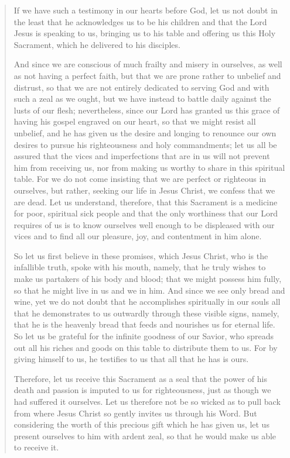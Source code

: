 \documentclass[
]{book}
\begin{document}
\begin{quote}
If we have such a testimony in our hearts before God, let us not doubt in the least that he acknowledges us to be his children and that the Lord Jesus is speaking to us, bringing us to his table and offering us this Holy Sacrament, which he delivered to his disciples.

And since we are conscious of much frailty and misery in ourselves, as well as not having a perfect faith, but that we are prone rather to unbelief and distrust, so that we are not entirely dedicated to serving God and with such a zeal as we ought, but we have instead to battle daily against the lusts of our flesh; nevertheless, since our Lord has granted us this grace of having his gospel engraved on our heart, so that we might resist all unbelief, and he has given us the desire and longing to renounce our own desires to pursue his righteousness and holy commandments; let us all be assured that the vices and imperfections that are in us will not prevent him from receiving us, nor from making us worthy to share in this spiritual table. For we do not come insisting that we are perfect or righteous in ourselves, but rather, seeking our life in Jesus Christ, we confess that we are dead. Let us understand, therefore, that this Sacrament is a medicine for poor, spiritual sick people and that the only worthiness that our Lord requires of us is to know ourselves well enough to be displeased with our vices and to find all our pleasure, joy, and contentment in him alone.

So let us first believe in these promises, which Jesus Christ, who is the infallible truth, spoke with his mouth, namely, that he truly wishes to make us partakers of his body and blood; that we might possess him fully, so that he might live in us and we in him. And since we see only bread and wine, yet we do not doubt that he accomplishes spiritually in our souls all that he demonstrates to us outwardly through these visible signs, namely, that he is the heavenly bread that feeds and nourishes us for eternal life. So let us be grateful for the infinite goodness of our Savior, who spreads out all his riches and goods on this table to distribute them to us. For by giving himself to us, he testifies to us that all that he has is ours.

Therefore, let us receive this Sacrament as a seal that the power of his death and passion is imputed to us for righteousness, just as though we had suffered it ourselves. Let us therefore not be so wicked as to pull back from where Jesus Christ so gently invites us through his Word. But considering the worth of this precious gift which he has given us, let us present ourselves to him with ardent zeal, so that he would make us able to receive it.


\end{quote}
\end{document}
